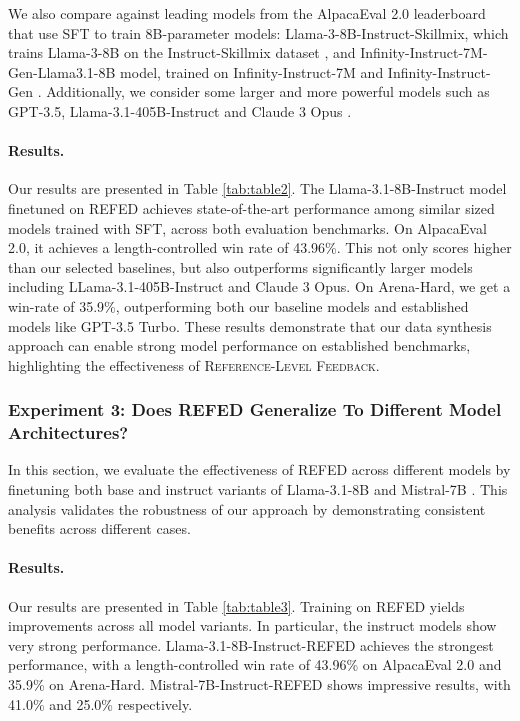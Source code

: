 We also compare against leading models from the AlpacaEval 2.0 leaderboard that use SFT to train 8B-parameter models: Llama-3-8B-Instruct-Skillmix, which trains Llama-3-8B on the Instruct-Skillmix dataset \citep{kaur2024instruct}, and Infinity-Instruct-7M-Gen-Llama3.1-8B model, trained on Infinity-Instruct-7M and Infinity-Instruct-Gen \citep{InfinityInstruct2024}. Additionally, we consider some larger and more powerful models such as GPT-3.5, Llama-3.1-405B-Instruct \citep{dubey2024llama3herdmodels} and Claude 3 Opus \citep{anthropic_claude3}.

\paragraph{Results.}

Our results are presented in Table \ref{tab:table2}. The Llama-3.1-8B-Instruct model finetuned on \textsc{REFED} achieves state-of-the-art performance among similar sized models trained with SFT, across both evaluation benchmarks. On AlpacaEval 2.0, it achieves a length-controlled win rate of 43.96\%. This not only scores higher than our selected baselines, but also outperforms significantly larger models including LLama-3.1-405B-Instruct and Claude 3 Opus. On Arena-Hard, we get a win-rate of 35.9\%, outperforming both our baseline models and established models like GPT-3.5 Turbo. These results demonstrate that our data synthesis approach can enable strong model performance on established benchmarks, highlighting the effectiveness of \textsc{Reference-Level Feedback}.

\subsubsection{Experiment 3: Does \textsc{REFED} Generalize To Different Model Architectures?}

In this section, we evaluate the effectiveness of \textsc{REFED} across different models by finetuning both base and instruct variants of Llama-3.1-8B \citep{grattafiori2024llama3herdmodels} and Mistral-7B \citep{jiang2023mistral7b}. This analysis validates the robustness of our approach by demonstrating consistent benefits across different cases.

\paragraph{Results.}

Our results are presented in Table \ref{tab:table3}. Training on \textsc{REFED} yields improvements across all model variants. In particular, the instruct models show very strong performance. Llama-3.1-8B-Instruct-\textsc{REFED} achieves the strongest performance, with a length-controlled win rate of 43.96\% on AlpacaEval 2.0 and 35.9\% on Arena-Hard. Mistral-7B-Instruct-\textsc{REFED} shows impressive results, with 41.0\% and 25.0\% respectively. 

